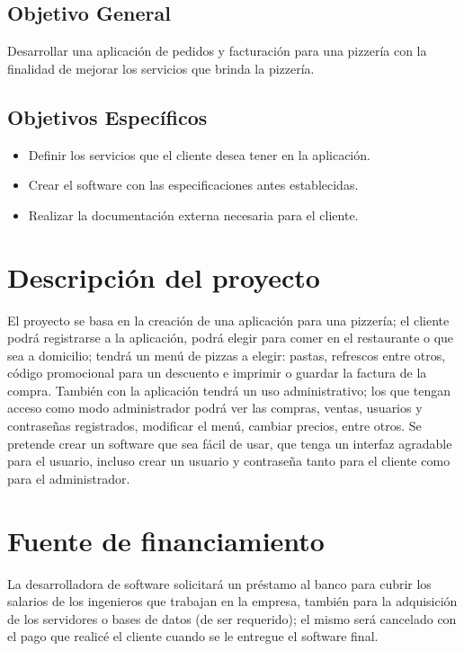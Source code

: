 \documentclass[conference]{IEEEtran}
\begin{document}
\subsection{Objetivo General}

Desarrollar una aplicación de pedidos y facturación para una pizzería con la finalidad de mejorar los servicios que brinda la pizzería.

\subsection{Objetivos Específicos}
\begin{itemize}
\item Definir los servicios que el cliente desea tener en la aplicación.
\item Crear el software con las especificaciones antes establecidas.
\item Realizar la documentación externa necesaria para el cliente.
\end{itemize}


\section{Descripción del proyecto}

El proyecto se basa en la creación de una aplicación para una pizzería; el cliente podrá registrarse a la aplicación, podrá elegir para comer en el restaurante o que sea a domicilio; tendrá un menú de pizzas a elegir: pastas, refrescos entre otros, código promocional para un descuento e imprimir o guardar la factura de la compra. 
También con la aplicación tendrá un uso administrativo; los que tengan acceso como modo administrador podrá ver las compras, ventas, usuarios y contraseñas registrados, modificar el menú, cambiar precios, entre otros.
Se pretende crear un software que sea fácil de usar, que tenga un interfaz agradable para el usuario, incluso crear un usuario y contraseña tanto para el cliente como para el administrador.


\section{Fuente de financiamiento}

La desarrolladora de software solicitará un préstamo al banco para cubrir los salarios de los ingenieros que trabajan en la empresa, también para la adquisición de los servidores o bases de datos (de ser requerido); el mismo será cancelado con el pago que realicé el cliente cuando se le entregue el software final.
\end{document}
